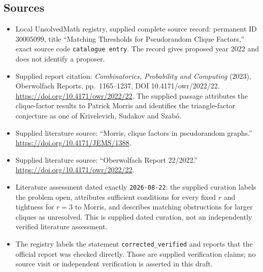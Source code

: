 \documentclass[11pt]{article}
\begin{document}
\subsection{Sources}
\begin{itemize}
\item Local UnsolvedMath registry, supplied complete source record: permanent ID \(30005099\), title ``Matching Thresholds for Pseudorandom Clique Factors,'' exact source code \texttt{catalogue entry}. The record gives proposed year 2022 and does not identify a proposer.
\item Supplied report citation: \emph{Combinatorics, Probability and Computing} (2023), Oberwolfach Reports, pp.\ 1165--1237, DOI 10.4171/owr/2022/22. \url{https://doi.org/10.4171/owr/2022/22}. The supplied passage attributes the clique-factor results to Patrick Morris and identifies the triangle-factor conjecture as one of Krivelevich, Sudakov and Szab\'o.
\item Supplied literature source: ``Morris, clique factors in pseudorandom graphs.'' \url{https://doi.org/10.4171/JEMS/1388}.
\item Supplied literature source: ``Oberwolfach Report 22/2022.'' \url{https://doi.org/10.4171/owr/2022/22}.
\item Literature assessment dated exactly \texttt{2026-08-22}: the supplied curation labels the problem open, attributes sufficient conditions for every fixed \(r\) and tightness for \(r=3\) to Morris, and describes matching obstructions for larger cliques as unresolved. This is supplied dated curation, not an independently verified literature assessment.
\item The registry labels the statement \texttt{corrected\_verified} and reports that the official report was checked directly. Those are supplied verification claims; no source visit or independent verification is asserted in this draft.
\end{itemize}
\end{document}
